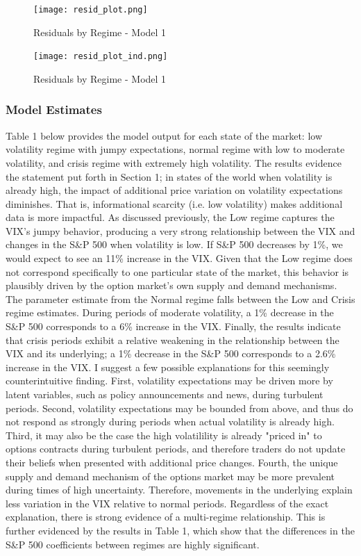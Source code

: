 \documentclass[11pt,a4paper,oldfontcommands]{memoir}
\begin{document}
{\begin{figure}[h]
\caption{Residuals by Regime - Model 1}
\texttt{[image: resid\_plot.png]} 
\centering
\label{}
\end{figure}

\begin{figure}[H]
\caption{Residuals by Regime - Model 1}
\texttt{[image: resid\_plot\_ind.png]} 
\centering
\end{figure}


\subsubsection{Model Estimates}

Table 1 below provides the model output for each state of the market: low volatility regime with jumpy expectations, normal regime with low to moderate volatility, and crisis regime with extremely high volatility. The results evidence the statement put forth in Section 1; in states of the world when volatility is already high, the impact of additional price variation on volatility expectations diminishes. That is, informational scarcity (i.e. low volatility) makes additional data is more impactful. As discussed previously, the Low regime captures the VIX's jumpy behavior, producing a very strong relationship between the VIX and changes in the S\&P 500 when volatility is low. If S\&P 500 decreases by 1\%, we would expect to see an 11\% increase in the VIX. Given that the Low regime does not correspond specifically to one particular state of the market, this behavior is plausibly driven by the option market's own supply and demand mechanisms. The parameter estimate from the Normal regime falls between the Low and Crisis regime estimates. During periods of moderate volatility, a 1\% decrease in the S\&P 500 corresponds to a 6\% increase in the VIX. Finally, the results indicate that crisis periods exhibit a relative weakening in the relationship between the VIX and its underlying; a 1\% decrease in the S\&P 500 corresponds to a 2.6\% increase in the VIX. I suggest a few possible explanations for this seemingly counterintuitive finding. First, volatility expectations may be driven more by latent variables, such as policy announcements and news, during turbulent periods. Second, volatility expectations may be bounded from above, and thus do not respond as strongly during periods when actual volatility is already high. Third, it may also be the case the high volatilility is already "priced in" to options contracts during turbulent periods, and therefore traders do not update their beliefs when presented with additional price changes. Fourth, the unique supply and demand mechanism of the options market may be more prevalent during times of high uncertainty. Therefore, movements in the underlying explain less variation in the VIX relative to normal periods. Regardless of the exact explanation, there is strong evidence of a multi-regime relationship. This is further evidenced by the results in Table 1, which show that the differences in the S\&P 500 coefficients between regimes are highly significant. 



}
\end{document}
